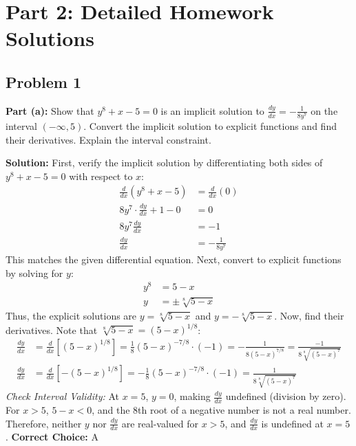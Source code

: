 \documentclass[12pt]{article}
\begin{document}
\section{Part 2: Detailed Homework Solutions}

\subsection*{Problem 1}
\textbf{Part (a):} Show that $y^8 + x - 5 = 0$ is an implicit solution to $\frac{dy}{dx} = -\frac{1}{8y^7}$ on the interval $(-\infty, 5)$. Convert the implicit solution to explicit functions and find their derivatives. Explain the interval constraint.

\textbf{Solution:}
First, verify the implicit solution by differentiating both sides of $y^8 + x - 5 = 0$ with respect to $x$:
\begin{align*}
    \frac{d}{dx} \left( y^8 + x - 5 \right) &= \frac{d}{dx} (0) \\
    8y^7 \cdot \frac{dy}{dx} + 1 - 0 &= 0 \\
    8y^7 \frac{dy}{dx} &= -1 \\
    \frac{dy}{dx} &= -\frac{1}{8y^7}
\end{align*}
This matches the given differential equation. Next, convert to explicit functions by solving for $y$:
\begin{align*}
    y^8 &= 5 - x \\
    y &= \pm \sqrt[8]{5 - x}
\end{align*}
Thus, the explicit solutions are $y = \sqrt[8]{5 - x}$ and $y = -\sqrt[8]{5 - x}$. 
Now, find their derivatives. Note that $\sqrt[8]{5-x} = (5-x)^{1/8}$:
\begin{align*}
    \frac{dy}{dx} &= \frac{d}{dx} \left[ (5-x)^{1/8} \right] = \frac{1}{8}(5-x)^{-7/8} \cdot (-1) = -\frac{1}{8(5-x)^{7/8}} = \frac{-1}{8\sqrt[8]{(5-x)^7}} \\
    \frac{dy}{dx} &= \frac{d}{dx} \left[ -(5-x)^{1/8} \right] = -\frac{1}{8}(5-x)^{-7/8} \cdot (-1) = \frac{1}{8\sqrt[8]{(5-x)^7}}
\end{align*}
\textit{Check Interval Validity:} At $x = 5$, $y = 0$, making $\frac{dy}{dx}$ undefined (division by zero). For $x > 5$, $5-x < 0$, and the 8th root of a negative number is not a real number. Therefore, neither $y$ nor $\frac{dy}{dx}$ are real-valued for $x > 5$, and $\frac{dy}{dx}$ is undefined at $x = 5$.
\textbf{Correct Choice:} A

\vspace{0.5cm}
\end{document}
